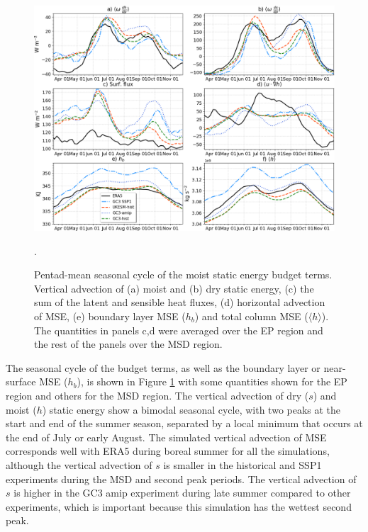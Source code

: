 \begin{figure}[b!]
\includegraphics[width=\linewidth]{figures/thermopentad}
\caption[Seasonal cycle of MSE budget terms]{Pentad-mean seasonal cycle of the moist static energy budget terms. Vertical advection of (a) moist and (b) dry static energy, (c) the sum of the latent and sensible heat fluxes, (d) horizontal advection of MSE, (e) boundary layer MSE ($h_b$) and total column MSE ($\langle h \rangle$). The quantities in panels c,d were averaged over the EP region and the rest of the panels over the MSD region. }. 
\label{fig:thermo_pentad}
\end{figure}



 
 The seasonal cycle of the budget terms, as well as the boundary layer or near-surface MSE ($h_b$), is shown in Figure \ref{fig:thermo_pentad} with some quantities shown for the EP region and others for the MSD region. The vertical advection of dry ($s$) and moist ($h$) static energy show a bimodal seasonal cycle, with two peaks at the start and end of the summer season, separated by a local minimum that occurs at the end of July or early August.
 The simulated vertical advection of MSE corresponds well with ERA5 during boreal summer for all the simulations, although the vertical advection of $s$ is smaller in the historical and SSP1 experiments during the MSD and second peak periods. The vertical advection of $s$ is higher in the GC3 amip experiment during late summer compared to other experiments, which is important because this simulation has the wettest second peak. 

